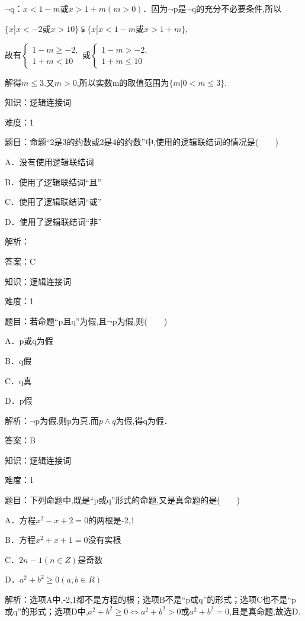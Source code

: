 \documentclass{article} %
\begin{document}
$\neg$q：$x<1-m$或$x>1+m(m>0)$．因为$\neg$p是$\neg$q的充分不必要条件,所以

$\{x|x<-2或x>10 \} \subsetneqq \{x|x<1-m或x>1+m \}$,

故有$\left\{
\begin{array}{l}
1-m\ge -2, \\
1+m<10
\end{array}
\right.$或$\left\{
\begin{array}{l}
1-m>-2, \\
1+m\le 10
\end{array}
\right.$

解得$m\le 3$.又$m>0$,所以实数m的取值范围为$\{m|0<m\le 3 \}$.



知识：逻辑连接词

难度：1

题目：命题``2是3的约数或2是4的约数''中,使用的逻辑联结词的情况是(　　)

A．没有使用逻辑联结词

B．使用了逻辑联结词``且''

C．使用了逻辑联结词``或''

D．使用了逻辑联结词``非''

解析：

答案：C



知识：逻辑连接词

难度：1

题目：若命题``p且q''为假,且$\neg$p为假,则(　　)

A．p或q为假   

B．q假

C．q真   

D．p假

解析：$\neg$p为假,则p为真,而$p \wedge q$为假,得q为假．

答案：B



知识：逻辑连接词

难度：1

题目：下列命题中,既是``p或q''形式的命题,又是真命题的是(　　)

A．方程$x^{2}-x+2=0$的两根是-2,1

B．方程$x^{2}+x+1=0$没有实根

C．$2n-1(n \in Z)$是奇数

D．$a^{2}+b^{2}\ge 0(a,b\in R)$

解析：选项A中,-2,1都不是方程的根；选项B不是``p或q''的形式；选项C也不是``p或q''的形式；选项D中,$a^{2}+b^{2}\ge 0 \Leftrightarrow a^{2}+b^{2}>0$或$a^{2}+b^{2}=0$,且是真命题,故选D.
\end{document}
